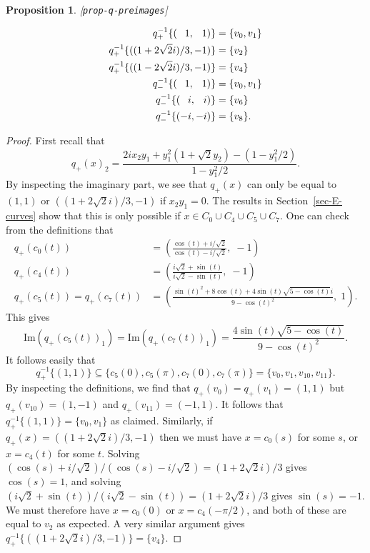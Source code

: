 \documentclass[reqno]{amsart}
\newcommand{\lbl}[1]{\label{#1}\textup{[\texttt{#1}]}\par}
\newcommand{\lbl}{\label}
\newcommand{\sse}       {\subseteq}
\newcommand{\rt}        {\sqrt{2}}
\newcommand{\pp}        {\hphantom{+}}
\renewcommand{\:}{\colon}
\newtheorem{proposition}[theorem]{Proposition}
\theoremstyle{definition}
\begin{document}
\begin{proposition}\lbl{prop-q-preimages}
 \begin{align*}
  q_+^{-1}\{(\pp 1,\pp 1)\}     &= \{v_0,v_1\} \\
  q_+^{-1}\{((1+2\rt i)/3,-1)\} &= \{v_2\}     \\
  q_+^{-1}\{((1-2\rt i)/3,-1)\} &= \{v_4\}     \\
  q_-^{-1}\{(\pp 1,\pp 1)\}     &= \{v_0,v_1\} \\
  q_-^{-1}\{(\pp i,\pp i)\}     &= \{v_6\}     \\
  q_-^{-1}\{(   -i,   -i)\}     &= \{v_8\}.
 \end{align*}
\end{proposition}
\begin{proof}
 First recall that
 \[ q_+(x)_2 =
     \frac{2ix_2y_1 + y_1^2(1+\rt y_2) - (1-y_1^2/2)}{1-y_1^2/2}.
 \]
 By inspecting the imaginary part, we see that $q_+(x)$ can only be
 equal to $(1,1)$ or $((1+2\rt i)/3,-1)$ if $x_2y_1=0$.  The results
 in Section~\ref{sec-E-curves} show that this is only possible
 if $x\in C_0\cup C_4\cup C_5\cup C_7$.  One can check from the
 definitions that
 \begin{align*}
  q_+(c_{ 0}(t)) &=
   \left(\frac{\cos(t)+i/\rt}{\cos(t)-i/\rt},\;-1\right) \\
  q_+(c_{ 4}(t)) &=
   \left(\frac{i\rt+\sin(t)}{i\rt-\sin(t)} ,\; -1\right) \\
  q_+(c_{ 5}(t)) = q_+(c_{ 7}(t)) &=
   \left( \frac{\sin(t)^2+8\cos(t)+4\sin(t)\sqrt{5-\cos(t)}i}{9-\cos(t)^2},\; 1\right).
 \end{align*}
 This gives
 \[
  \text{Im}(q_+(c_5(t))_1) =
  \text{Im}(q_+(c_7(t))_1) =
   \frac{4\sin(t)\sqrt{5-\cos(t)}}{9-\cos(t)^2}.
 \]
 It follows easily that
 \[ q_+^{-1}\{(1,1)\} \sse \{c_5(0),c_5(\pi),c_7(0),c_7(\pi)\} =
     \{v_0,v_1,v_{10},v_{11}\}.
 \]
 By inspecting the definitions, we find that $q_+(v_0)=q_+(v_1)=(1,1)$
 but $q_+(v_{10})=(1,-1)$ and $q_+(v_{11})=(-1,1)$.  It follows that
 $q_+^{-1}\{(1,1)\}=\{v_0,v_1\}$ as claimed.  Similarly, if
 $q_+(x)=((1+2\rt i)/3,-1)$ then we must have $x=c_0(s)$ for some $s$,
 or $x=c_4(t)$ for some $t$.  Solving
 $(\cos(s)+i/\rt)/(\cos(s)-i/\rt)=(1+2\rt i)/3$ gives $\cos(s)=1$, and
 solving $(i\rt+\sin(t))/(i\rt-\sin(t))=(1+2\rt i)/3$ gives
 $\sin(s)=-1$.  We must therefore have $x=c_0(0)$ or $x=c_4(-\pi/2)$,
 and both of these are equal to $v_2$ as expected.  A very similar
 argument gives $q_+^{-1}\{((1+2\rt i)/3,-1)\}=\{v_4\}$.


\end{proof}
\end{document}
